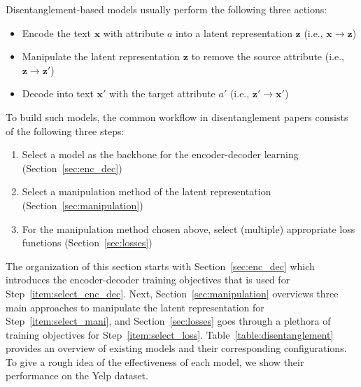 \label{sec:disentanglement}
Disentanglement-based models usually perform the following three actions:
\begin{itemize}
    \item Encode the text $\bm{x}$ with attribute $a$ into a latent representation $\bm{z}$ (i.e., $\bm{x} \rightarrow \bm{z}$) \label{item:disent_encode}
    \item Manipulate the latent representation $\bm{z}$ to remove the source attribute (i.e., $\bm{z} \rightarrow \bm{z}'$) \label{item:disent_manipulate}
    \item Decode into text $\bm{x}'$ with the target attribute $a'$ (i.e., $\bm{z}' \rightarrow \bm{x}'$)
    \label{item:disent_decode}
\end{itemize}
To build such models, the common workflow in disentanglement papers consists of the following three steps:
\begin{enumerate}[align=left, leftmargin=*,label=Step \arabic*), ref=\arabic*]
    \item Select a model as the backbone for the encoder-decoder learning (Section~\ref{sec:enc_dec}) \label{item:select_enc_dec}
    \item Select a manipulation method of the latent representation (Section~\ref{sec:manipulation}) \label{item:select_mani}
    \item For the manipulation method chosen above, select (multiple) appropriate loss functions (Section~\ref{sec:losses}) \label{item:select_loss}
\end{enumerate}
The organization of this section starts with Section~\ref{sec:enc_dec} which introduces the encoder-decoder training objectives that is used for Step~\ref{item:select_enc_dec}. Next, Section~\ref{sec:manipulation} overviews three main approaches to manipulate the latent representation for Step~\ref{item:select_mani}, and Section~\ref{sec:losses} goes through a plethora of training objectives for Step~\ref{item:select_loss}.
Table~\ref{table:disentanglement} provides an overview of existing models and their corresponding configurations. To give a rough idea of the effectiveness of each model, we show their performance on the Yelp dataset.
